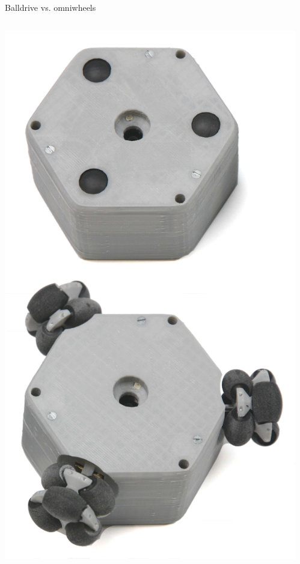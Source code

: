 \documentclass[compress]{beamer}
\begin{document}

\begin{frame}{Balldrive vs. omniwheels}
    \begin{columns}
        \begin{column}{0.4\linewidth}
            \begin{center}
                \includegraphics[width=0.8\linewidth]{balldrive-omniwheel}
            \end{center}
        \end{column}
        \begin{column}{0.6\linewidth}

\end{column}
\end{columns}
\end{frame}
\end{document}
